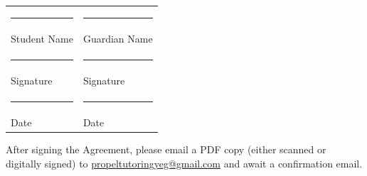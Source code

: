 \documentclass{article}
\begin{document}
\vspace{4em}

\noindent
\begin{tabular}{p{7cm} p{7cm}}
\rule{7cm}{0.4pt} & \rule{7cm}{0.4pt} \\
Student Name & Guardian Name \\[1.5em]

\rule{7cm}{0.4pt} & \rule{7cm}{0.4pt} \\
Signature & Signature \\[1.5em]

\rule{7cm}{0.4pt} & \rule{7cm}{0.4pt} \\
Date & Date
\end{tabular}

\vspace{2em}

After signing the Agreement, please email a PDF copy (either scanned or digitally signed) to \href{mailto:propeltutoringyeg@gmail.com}{propeltutoringyeg@gmail.com} and await a confirmation email.
\end{document}
